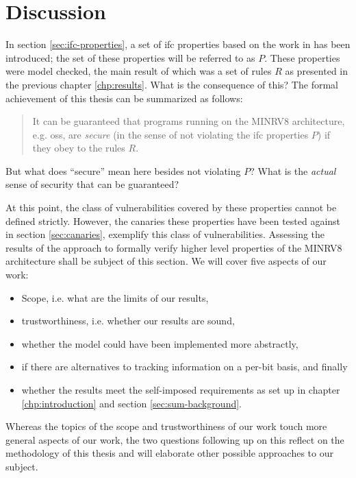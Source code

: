 
\chapter{Discussion}
\label{chp:discussion}

In section \ref{sec:ifc-properties}, a set of \gls{ifc} properties based on the work in \cite{Ferraiuolo17} has been introduced; the set of these properties will be referred to as $ P $.
These properties were model checked, the main result of which was a set of rules $ R $ as presented in the previous chapter \ref{chp:results}.
What is the consequence of this?
The formal achievement of this thesis can be summarized as follows:
\begin{quote}
    It can be guaranteed that programs running on the MINRV8 architecture, e.g. \glspl{os}, are \textit{secure} (in the sense of not violating the \gls{ifc} properties $ P $) if they obey to the rules $ R $.
\end{quote}
But what does \enquote{secure} mean here besides not violating $ P $?
What is the \textit{actual} sense of security that can be guaranteed?

At this point, the class of vulnerabilities covered by these properties cannot be defined strictly.
However, the canaries these properties have been tested against in section \ref{sec:canaries}, exemplify this class of vulnerabilities.
Assessing the results of the approach to formally verify higher level properties of the MINRV8 architecture shall be subject of this section.
We will cover five aspects of our work:
\begin{itemize}
    \item Scope, i.e. what are the limits of our results,
    \item trustworthiness, i.e. whether our results are sound,
    \item whether the model could have been implemented more abstractly,
    \item if there are alternatives to tracking information on a per-bit basis, and finally
    \item whether the results meet the self-imposed requirements as set up in chapter \ref{chp:introduction} and section \ref{sec:sum-background}.
\end{itemize}

Whereas the topics of the scope and trustworthiness of our work touch more general aspects of our work, the two questions following up on this reflect on the methodology of this thesis and will elaborate other possible approaches to our subject.

